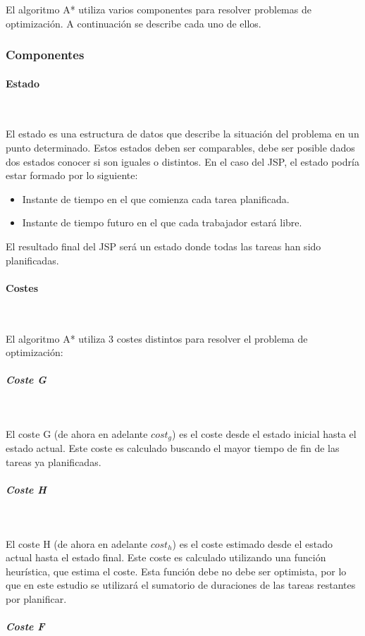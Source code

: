 El algoritmo A* utiliza varios componentes para resolver problemas
de optimización. A continuación se describe cada uno de ellos.

\subsubsection{Componentes}

\paragraph{Estado}~

El estado es una estructura de datos que describe la situación
del problema en un punto determinado.
Estos estados deben ser comparables,
debe ser posible dados dos estados conocer si son iguales o distintos.
En el caso del JSP, el estado podría estar formado por lo siguiente:

\begin{itemize}[itemsep=0.25px]
    \item Instante de tiempo en el que comienza cada tarea planificada.
    \item Instante de tiempo futuro en el que cada trabajador estará libre.
\end{itemize}

El resultado final del JSP será un estado donde todas las tareas han sido planificadas.

\paragraph{Costes}~

El algoritmo A* utiliza 3 costes distintos para resolver el problema de optimización:

\subparagraph{Coste G}~

El coste G (de ahora en adelante $cost_g$) es el coste desde el estado inicial
hasta el estado actual.
Este coste es calculado buscando el mayor tiempo de fin de
las tareas ya planificadas.

\subparagraph{Coste H}~

El coste H (de ahora en adelante $cost_h$) es el coste estimado desde el estado actual
hasta el estado final.
Este coste es calculado utilizando una función heurística,
que estima el coste.
Esta función debe no debe ser optimista,
por lo que en este estudio se utilizará el sumatorio de duraciones
de las tareas restantes por planificar.

\subparagraph{Coste F}~

